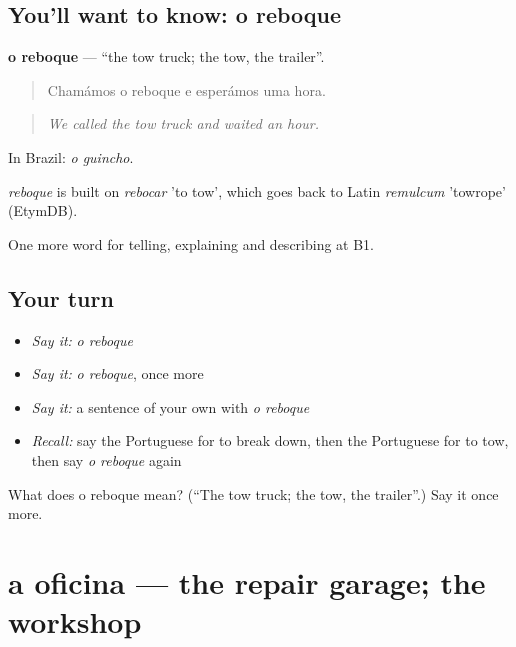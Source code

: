 \subsection*{You'll want to know: o reboque}
\textbf{o reboque} — \textquotedblleft{}the tow truck; the tow, the trailer\textquotedblright{}.

\begin{quote}
Chamámos o reboque e esperámos uma hora.
\end{quote}

\begin{quote}
\emph{We called the tow truck and waited an hour.}
\end{quote}

In Brazil: \emph{o guincho}.

\begin{cousinweb}
\emph{reboque} is built on \emph{rebocar} 'to tow', which goes back to Latin \emph{remulcum} 'towrope' (EtymDB).
\end{cousinweb}

\begin{grammarlens}[title={What you've built}]
One more word for telling, explaining and describing at B1.
\end{grammarlens}

\subsection*{Your turn}
\begin{itemize}
\raggedright
  \item \emph{Say it:} \emph{o reboque}
  \item \emph{Say it:} \emph{o reboque}, once more
  \item \emph{Say it:} a sentence of your own with \emph{o reboque}
  \item \emph{Recall:} say the Portuguese for to break down, then the Portuguese for to tow, then say \emph{o reboque} again
\end{itemize}

\begin{tcolorbox}[breakable,colback=teal!4,colframe=teal!35!black,title={Before you move on}]
What does o reboque mean? (\textquotedblleft{}The tow truck; the tow, the trailer\textquotedblright{}.) Say it once more.
\end{tcolorbox}
\section[a oficina]{a oficina — the repair garage; the workshop}


